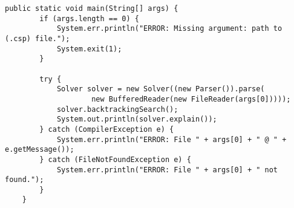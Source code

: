 
%
\begin{lstlisting}[caption=Solver.java (cont.), label=solver_c2, firstnumber=86]
    public static void main(String[] args) {
        if (args.length == 0) {
            System.err.println("ERROR: Missing argument: path to (.csp) file.");
            System.exit(1);
        }

        try {
            Solver solver = new Solver((new Parser()).parse(
                    new BufferedReader(new FileReader(args[0]))));
            solver.backtrackingSearch();
            System.out.println(solver.explain());
        } catch (CompilerException e) {
            System.err.println("ERROR: File " + args[0] + " @ " + e.getMessage());
        } catch (FileNotFoundException e) {
            System.err.println("ERROR: File " + args[0] + " not found.");
        }
    }
\end{lstlisting}
